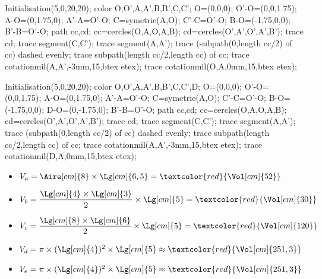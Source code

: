 \begin{exercice*}
\begin{center}
   \vspace*{-5mm}
   \begin{minipage}[t]{0.4\linewidth}
      \begin{Geometrie}[CoinBG={u*(-10,-10)},CoinHD={u*(10,10)},TypeTrace="Espace"]
         Initialisation(5,0,20,20);
         color O,O',A,A',B,B',C,C';
         O=(0,0,0);
         O'-O=(0,0,1.75);
         A-O=(0,1.75,0);
         A'-A=O'-O;
         C=symetrie(A,O);
         C'-C=O'-O;
         B-O=(-1.75,0,0);
         B'-B=O'-O;
         path cc,cd;
         cc=cercles(O,A,O,A,B);
         cd=cercles(O',A',O',A',B');
         trace cd;
         trace segment(C,C');
         trace segment(A,A');
         trace (subpath(0,length cc/2) of cc) dashed evenly;
         trace subpath(length cc/2,length cc) of cc;
         trace cotationmil(A,A',-3mm,15,btex  etex);
         trace cotationmil(O,A,0mm,15,btex  etex);         
      \end{Geometrie}  
   \end{minipage}
   \hfill
   \begin{minipage}[t]{0.4\linewidth}
      \begin{Geometrie}[CoinBG={u*(-10,-10)},CoinHD={u*(10,10)},TypeTrace="Espace"]
         Initialisation(5,0,20,20);
         color O,O',A,A',B,B',C,C',D;
         O=(0,0,0);
         O'-O=(0,0,1.75);
         A-O=(0,1.75,0);
         A'-A=O'-O;
         C=symetrie(A,O);
         C'-C=O'-O;
         B-O=(-1.75,0,0);
         D-O=(0,-1.75,0);
         B'-B=O'-O;
         path cc,cd;
         cc=cercles(O,A,O,A,B);
         cd=cercles(O',A',O',A',B');
         trace cd;
         trace segment(C,C');
         trace segment(A,A');
         trace (subpath(0,length cc/2) of cc) dashed evenly;
         trace subpath(length cc/2,length cc) of cc;
         trace cotationmil(A,A',-3mm,15,btex  etex);
         trace cotationmil(D,A,0mm,15,btex  etex);         
      \end{Geometrie}  
   \end{minipage}
   \end{center}   
\end{exercice*}

\begin{corrige}
   \begin{itemize}
      \item $V_a =\Aire[cm]{8}\times\Lg[cm]{6,5} =\textcolor{red}{\Vol[cm]{52}}$ \smallskip
      \item $V_b =\dfrac{\Lg[cm]{4}\times\Lg[cm]{3}}{2}\times\Lg[cm]{5} =\textcolor{red}{\Vol[cm]{30}}$ \smallskip
      \item $V_c =\dfrac{\Lg[cm]{8}\times\Lg[cm]{6}}{2}\times\Lg[cm]{5} =\textcolor{red}{\Vol[cm]{120}}$ \smallskip
      \item $V_d =\pi\times(\Lg[cm]{4})^2\times\Lg[cm]{5} \approx\textcolor{red}{\Vol[cm]{251,3}}$ \smallskip
      \item $V_e =\pi\times(\Lg[cm]{4})^2\times\Lg[cm]{5} \approx\textcolor{red}{\Vol[cm]{251,3}}$
   \end{itemize}
\end{corrige}
